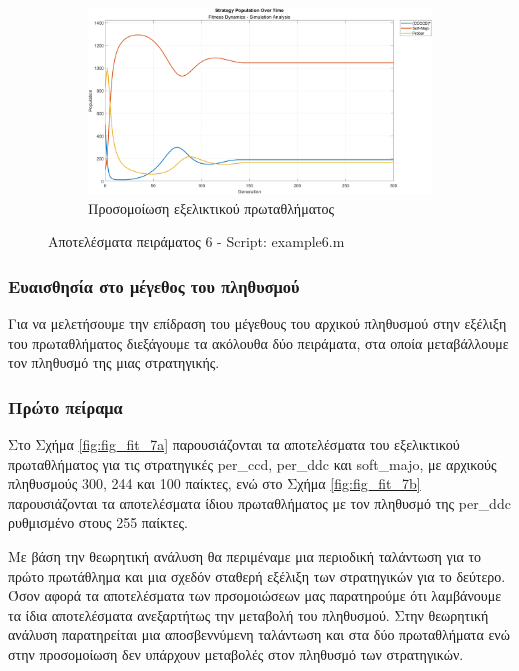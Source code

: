 \documentclass[12pt]{report}
\begin{document}
\begin{figure}[htbp]
\begin{subfigure}[b]{0.5\linewidth}
        \centering
        \includegraphics[width=\linewidth]{Figures Fitness Dynamics/example6-sim.png}
        \caption{Προσομοίωση εξελικτικού πρωταθλήματος}
        \label{fig:fig_fit_6_c}
    \end{subfigure}

    \caption{Αποτελέσματα πειράματος 6 - \foreignlanguage{english}{Script: example6.m}}
    \label{fig:fig_fit_6}
\end{figure}

\subsubsection{Ευαισθησία στο μέγεθος του πληθυσμού}
Για να μελετήσουμε την επίδραση του μέγεθους του αρχικού πληθυσμού στην εξέλιξη του πρωταθλήματος διεξάγουμε τα ακόλουθα δύο πειράματα, στα οποία μεταβάλλουμε τον πληθυσμό της μιας στρατηγικής.

\subsubsection*{Πρώτο πείραμα}
Στο Σχήμα \ref{fig:fig_fit_7a} παρουσιάζονται τα αποτελέσματα του εξελικτικού πρωταθλήματος για τις στρατηγικές \foreignlanguage{english}{per\_ccd, per\_ddc} και \foreignlanguage{english}{soft\_majo}, με αρχικούς πληθυσμούς 300, 244 και 100 παίκτες, ενώ στο Σχήμα \ref{fig:fig_fit_7b} παρουσιάζονται τα αποτελέσματα ίδιου πρωταθλήματος με τον πληθυσμό της \foreignlanguage{english}{per\_ddc} ρυθμισμένο στους 255 παίκτες.

Με βάση την θεωρητική ανάλυση θα περιμέναμε μια περιοδική ταλάντωση για το πρώτο πρωτάθλημα και μια σχεδόν σταθερή εξέλιξη των στρατηγικών για το δεύτερο. Όσον αφορά τα αποτελέσματα των πρσομοιώσεων μας παρατηρούμε ότι λαμβάνουμε τα ίδια αποτελέσματα ανεξαρτήτως την μεταβολή του πληθυσμού. Στην θεωρητική ανάλυση παρατηρείται μια αποσβεννύμενη ταλάντωση και στα δύο πρωταθλήματα ενώ στην προσομοίωση δεν υπάρχουν μεταβολές στον πληθυσμό των στρατηγικών. 
\end{document}
